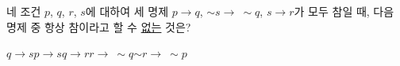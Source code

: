 네 조건 $p$, $q$, $r$, $s$에 대하여 세 명제 $p\longrightarrow q$, $\sim s\longrightarrow\ \sim q$, $s\longrightarrow r$가 모두 참일 때, 다음 명제 중 항상 참이라고 할 수 \underline{없는} 것은?
\begin{choices32}{$q\longrightarrow s$}{$p\longrightarrow s$}{$q\longrightarrow r$}{$r\longrightarrow\ \sim q$}{$\sim r\longrightarrow\ \sim p$}\end{choices32}
